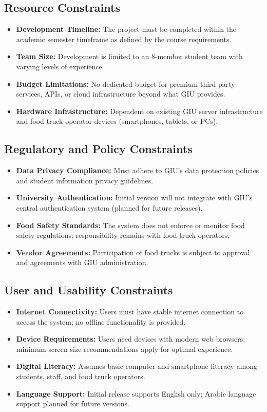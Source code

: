\documentclass[12pt,a4paper]{article}
\begin{document}
\subsection{Resource Constraints}
\begin{itemize}[leftmargin=2em, itemsep=8pt]
    \item \textbf{Development Timeline:} The project must be completed within the academic semester timeframe as defined by the course requirements.
    \item \textbf{Team Size:} Development is limited to an 8-member student team with varying levels of experience.
    \item \textbf{Budget Limitations:} No dedicated budget for premium third-party services, APIs, or cloud infrastructure beyond what GIU provides.
    \item \textbf{Hardware Infrastructure:} Dependent on existing GIU server infrastructure and food truck operator devices (smartphones, tablets, or PCs).
\end{itemize}

\subsection{Regulatory and Policy Constraints}
\begin{itemize}[leftmargin=2em, itemsep=8pt]
    \item \textbf{Data Privacy Compliance:} Must adhere to GIU's data protection policies and student information privacy guidelines.
    \item \textbf{University Authentication:} Initial version will not integrate with GIU's central authentication system (planned for future releases).
    \item \textbf{Food Safety Standards:} The system does not enforce or monitor food safety regulations; responsibility remains with food truck operators.
    \item \textbf{Vendor Agreements:} Participation of food trucks is subject to approval and agreements with GIU administration.
\end{itemize}

\subsection{User and Usability Constraints}
\begin{itemize}[leftmargin=2em, itemsep=8pt]
    \item \textbf{Internet Connectivity:} Users must have stable internet connection to access the system; no offline functionality is provided.
    \item \textbf{Device Requirements:} Users need devices with modern web browsers; minimum screen size recommendations apply for optimal experience.
    \item \textbf{Digital Literacy:} Assumes basic computer and smartphone literacy among students, staff, and food truck operators.
    \item \textbf{Language Support:} Initial release supports English only; Arabic language support planned for future versions.
\end{itemize}
\end{document}
